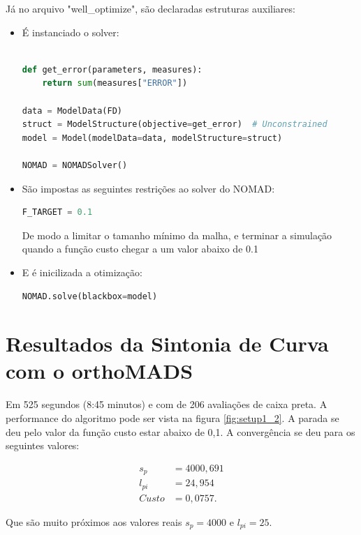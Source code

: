 Já no arquivo "well\_optimize", são declaradas estruturas auxiliares:
\begin{itemize}

\item É instanciado o solver:
\begin{lstlisting}[language=Python]%

def get_error(parameters, measures):
    return sum(measures["ERROR"])

data = ModelData(FD)
struct = ModelStructure(objective=get_error)  # Unconstrained
model = Model(modelData=data, modelStructure=struct)

NOMAD = NOMADSolver()

\end{lstlisting}



\item São impostas as seguintes restrições ao solver do NOMAD:
\begin{lstlisting}[language=Python]
F_TARGET = 0.1
\end{lstlisting}

De modo a limitar o tamanho mínimo da malha, e terminar a simulação quando a função custo chegar a um valor abaixo de 0.1

\item E é inicilizada a otimização:
\begin{lstlisting}[language=Python]
NOMAD.solve(blackbox=model)
\end{lstlisting}

\end{itemize}

\section{Resultados da Sintonia de Curva com o orthoMADS}

Em 525 segundos (8:45 minutos) e com de 206 avaliações de caixa preta. A performance do algoritmo pode ser vista na figura \ref{fig:setup1_2}. A parada se deu pelo valor da função custo estar abaixo de 0,1. A convergência se deu para os seguintes valores:

\begin{align*}
s_p&= 4000,691 \\
l_{pi} &= 24,954 \\
Custo &= 0,0757.
\end{align*}

Que são muito próximos aos valores reais $s_p=4000$ e $l_{pi}=25$.



